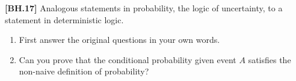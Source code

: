 \begin{exercise}
	\textbf{[BH.17]}  Analogous statements in probability, the logic of uncertainty, to a statement in deterministic logic.  
	\begin{enumerate}
		\item First answer the original questions in your own words.
		\item Can you prove that the conditional probability given event $A$ satisfies the non-naive definition of probability?
	\end{enumerate}
\end{exercise}
